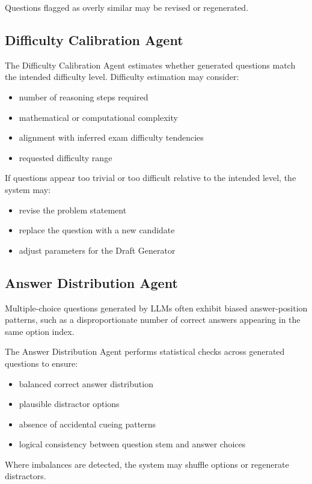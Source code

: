 \documentclass[11pt]{article}
\begin{document}
Questions flagged as overly similar may be revised or regenerated.

\subsection{Difficulty Calibration Agent}
The Difficulty Calibration Agent estimates whether generated questions match the intended difficulty level. Difficulty estimation may consider:

\begin{itemize}
\item number of reasoning steps required
\item mathematical or computational complexity
\item alignment with inferred exam difficulty tendencies
\item requested difficulty range
\end{itemize}

If questions appear too trivial or too difficult relative to the intended level, the system may:

\begin{itemize}
\item revise the problem statement
\item replace the question with a new candidate
\item adjust parameters for the Draft Generator
\end{itemize}

\subsection{Answer Distribution Agent}
Multiple-choice questions generated by LLMs often exhibit biased answer-position patterns, such as a disproportionate number of correct answers appearing in the same option index.

The Answer Distribution Agent performs statistical checks across generated questions to ensure:

\begin{itemize}
\item balanced correct answer distribution
\item plausible distractor options
\item absence of accidental cueing patterns
\item logical consistency between question stem and answer choices
\end{itemize}

Where imbalances are detected, the system may shuffle options or regenerate distractors.
\end{document}

